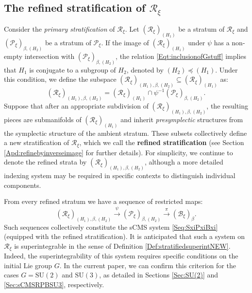 \documentclass[12pt]{amsart}
\theoremstyle{definition}
\numberwithin{equation}{section}
\newcommand{\SU}{\mathrm{SU}}
\newcommand{\Reducedxi}{\mathcal{R}_\xi}
\newcommand{\Pxi}{\mathcal{P}_{\xi}}
\newcommand{\Bxi}{\mathcal{B}_{\xi}}
\newcommand{\partialless}{\preccurlyeq}
\begin{document}
\subsection{The refined stratification of $\Reducedxi$}\label{Sec:refineReducedxi}
Consider the \emph{primary stratification} of $\Reducedxi$. Let $(\Reducedxi)_{(H_1)}$ be a stratum of $\Reducedxi$ and $(\Pxi)_{\beta,(H_2)}$ be a stratum of $\Pxi$. If the image of $(\Reducedxi)_{(H_1)}$ under $\psi$ has a non-empty intersection with $(\Pxi)_{\beta,(H_2)}$, the relation \eqref{Eqt:inclusionofGstuff} implies that $H_1$ is conjugate to a subgroup of $H_2$, denoted by $(H_2) \partialless (H_1)$. Under this condition, we define the subspace $(\Reducedxi)_{(H_1),\beta,(H_2)} \subseteq (\Reducedxi)_{(H_1)}$ as:
$$
(\Reducedxi)_{(H_1),\beta,(H_2)}=(\Reducedxi)_{(H_1)}\cap \psi^{-1} (\Pxi)_{\beta,(H_2)}.
$$
Suppose that after an appropriate subdivision of $(\Reducedxi)_{(H_1),\beta,(H_2)}$, the resulting pieces are submanifolds of $(\Reducedxi)_{(H_1)}$ and inherit \emph{presymplectic} structures from the symplectic structure of the ambient stratum. These subsets collectively define a new stratification of $\Reducedxi$, which we call the \textbf{refined stratification} (see Section \ref{Apd:refinebyinverseimage} for further details). For simplicity, we continue to denote the refined strata by $(\Reducedxi)_{(H_1),\beta,(H_2)}$, although a more detailed indexing system may be required in specific contexts to distinguish individual components.



 
From every refined stratum we have a sequence of restricted maps:
\begin{equation}\label{Seq:fromRH1betaH2}
		(\Reducedxi)_{(H_1),\beta,(H_2)} \stackrel{\psi}{\longrightarrow} (\Pxi)_{\beta,(H_2)} \stackrel{\pi}{\longrightarrow} (\Bxi)_{\beta}.
	\end{equation}
Such sequences collectively constitute the sCMS system \eqref{Seq:SxiPxiBxi} (equipped with the  refined stratification).  It is anticipated that such a system  on  $\Reducedxi$ is superintegrable in the sense of Definition \ref{Def:stratifiedsuperintNEW}. Indeed, the superintegrability of this system   requires specific conditions on the initial Lie group $G$. In the current paper, we can confirm this criterion for the cases $G=\SU(2)$ and $\SU(3)$, as detailed in Sections \ref{Sec:SU(2)} and \ref{Sec:sCMSRPBSU3}, respectively.
 
	
\end{document}
